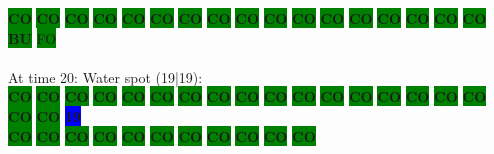 \colorbox{green}{\color[rgb]{0,0,0}\textbf{CO}}%
\colorbox{green}{\color[rgb]{0,0,0}\textbf{CO}}%
\colorbox{green}{\color[rgb]{0,0,0}\textbf{CO}}%
\colorbox{green}{\color[rgb]{0,0,0}\textbf{CO}}%
\colorbox{green}{\color[rgb]{0,0,0}\textbf{CO}}%
\colorbox{green}{\color[rgb]{0,0,0}\textbf{CO}}%
\colorbox{green}{\color[rgb]{0,0,0}\textbf{CO}}%
\colorbox{green}{\color[rgb]{0,0,0}\textbf{CO}}%
\colorbox{green}{\color[rgb]{0,0,0}\textbf{CO}}%
\colorbox{green}{\color[rgb]{0,0,0}\textbf{CO}}%
\colorbox{green}{\color[rgb]{0,0,0}\textbf{CO}}%
\colorbox{green}{\color[rgb]{0,0,0}\textbf{CO}}%
\colorbox{green}{\color[rgb]{0,0,0}\textbf{CO}}%
\colorbox{green}{\color[rgb]{0,0,0}\textbf{CO}}%
\colorbox{green}{\color[rgb]{0,0,0}\textbf{CO}}%
\colorbox{green}{\color[rgb]{0,0,0}\textbf{CO}}%
\colorbox{green}{\color[rgb]{0,0,0}\textbf{CO}}%
\colorbox{green}{\color[rgb]{1,0,0}\textbf{BU}}%
\colorbox{green}{\color[gray]{0.75}FO}%
\\
\\
At time 20: Water spot (19|19):
\\
\colorbox{green}{\color[rgb]{0,0,0}\textbf{CO}}%
\colorbox{green}{\color[rgb]{0,0,0}\textbf{CO}}%
\colorbox{green}{\color[rgb]{0,0,0}\textbf{CO}}%
\colorbox{green}{\color[rgb]{0,0,0}\textbf{CO}}%
\colorbox{green}{\color[rgb]{0,0,0}\textbf{CO}}%
\colorbox{green}{\color[rgb]{0,0,0}\textbf{CO}}%
\colorbox{green}{\color[rgb]{0,0,0}\textbf{CO}}%
\colorbox{green}{\color[rgb]{0,0,0}\textbf{CO}}%
\colorbox{green}{\color[rgb]{0,0,0}\textbf{CO}}%
\colorbox{green}{\color[rgb]{0,0,0}\textbf{CO}}%
\colorbox{green}{\color[rgb]{0,0,0}\textbf{CO}}%
\colorbox{green}{\color[rgb]{0,0,0}\textbf{CO}}%
\colorbox{green}{\color[rgb]{0,0,0}\textbf{CO}}%
\colorbox{green}{\color[rgb]{0,0,0}\textbf{CO}}%
\colorbox{green}{\color[rgb]{0,0,0}\textbf{CO}}%
\colorbox{green}{\color[rgb]{0,0,0}\textbf{CO}}%
\colorbox{green}{\color[rgb]{0,0,0}\textbf{CO}}%
\colorbox{green}{\color[rgb]{0,0,0}\textbf{CO}}%
\colorbox{green}{\color[rgb]{0,0,0}\textbf{CO}}%
\colorbox{blue}{\color[rgb]{1,0,0}\textbf{19}}%
\\
\colorbox{green}{\color[rgb]{0,0,0}\textbf{CO}}%
\colorbox{green}{\color[rgb]{0,0,0}\textbf{CO}}%
\colorbox{green}{\color[rgb]{0,0,0}\textbf{CO}}%
\colorbox{green}{\color[rgb]{0,0,0}\textbf{CO}}%
\colorbox{green}{\color[rgb]{0,0,0}\textbf{CO}}%
\colorbox{green}{\color[rgb]{0,0,0}\textbf{CO}}%
\colorbox{green}{\color[rgb]{0,0,0}\textbf{CO}}%
\colorbox{green}{\color[rgb]{0,0,0}\textbf{CO}}%
\colorbox{green}{\color[rgb]{0,0,0}\textbf{CO}}%
\colorbox{green}{\color[rgb]{0,0,0}\textbf{CO}}%
\colorbox{green}{\color[rgb]{0,0,0}\textbf{CO}}%
